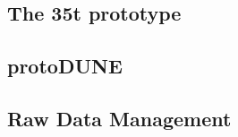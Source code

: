 \subsection{The 35t prototype}

\newpage
\subsection{protoDUNE}




\subsection{Raw Data Management}
